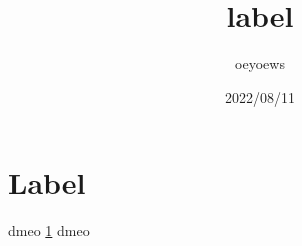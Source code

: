 \documentclass[UTF8]{article}
\title{label}
\author{oeyoews}
\date{2022/08/11}
\begin{document}
\maketitle

\section{Label}%
\label{sec:Label}

dmeo \ref{sec:Label} dmeo
\end{document}
